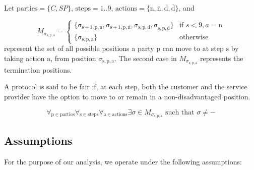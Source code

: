 \documentclass[pdftex,twocolumn,epjc3]{svjour3}
\newcommand{\normal}{\mathrm{n}}
\newcommand{\dispute}{\mathrm{d}}
\newcommand{\abnormal}{\overline{\mathrm{n}}}
\newcommand{\abdispute}{\overline{\mathrm{d}}}
\begin{document}
\begin{definition}[Fairness] \label{def:fairness}
Let $\mathrm{parties} = \{ C, SP \}$, $\mathrm{steps} = 1..9$, $\mathrm{actions} = \{ \normal{}, \abnormal{}, \dispute{}, \abdispute{} \}$, and 

\begin{equation}
M_{\sigma_\mathrm{s,p,a}} = 
\begin{cases} 
\{ \mathrm{\sigma_{s+1,p,\normal}}, \mathrm{\sigma_{s+1,p,\abnormal}}, \mathrm{\sigma_{s,p,\dispute}}, \mathrm{\sigma_{s,p,\abdispute}} \} & \text{if } s < 9, a = \normal{} \\
\{ \mathrm{\sigma_{s,p,a}} \} & \text{otherwise} 
\end{cases}
\end{equation}
represent the set of all possible positions a party $\mathrm{p}$ can move to at step $\mathrm{s}$ by taking action $\mathrm{a}$, from position $\sigma_\mathrm{s,p,a}$. The second case in $M_{\sigma_\mathrm{s,p,a}}$ represents the termination positions.

A protocol is said to be fair if, at each step, both the customer and the service provider have the option to move to or remain in a non-disadvantaged position.

\begin{equation}
\forall_{\mathrm{p} \in \mathrm{parties}} \forall_{\mathrm{s} \in \mathrm{steps}} \forall_{\mathrm{a} \in \mathrm{actions}} \exists \sigma \in M_{\sigma_\mathrm{s, p, a}} \text{ such that } \sigma \neq -
\end{equation}
\end{definition}


\subsection{Assumptions}\label{sec:assumptions}

For the purpose of our analysis, we operate under the following assumptions:
\end{document}
